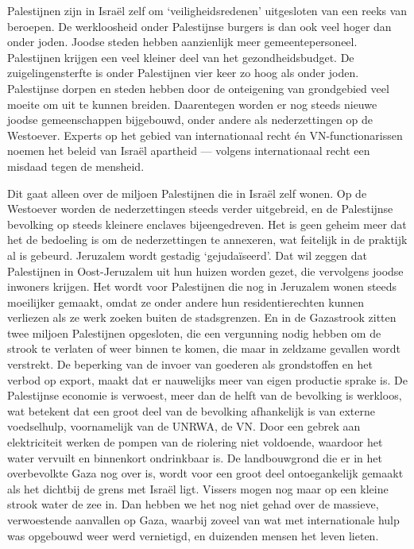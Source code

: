 Palestijnen zijn in Israël zelf om `veiligheidsredenen' uitgesloten van
een reeks van beroepen. De werkloosheid onder Palestijnse burgers is dan
ook veel hoger dan onder joden. Joodse steden hebben aanzienlijk meer
gemeentepersoneel. Palestijnen krijgen een veel kleiner deel van het
gezondheidsbudget. De zuigelingensterfte is onder Palestijnen vier keer
zo hoog als onder joden. Palestijnse dorpen en steden hebben door de
onteigening van grondgebied veel moeite om uit te kunnen breiden.
Daarentegen worden er nog steeds nieuwe joodse gemeenschappen
bijgebouwd, onder andere als nederzettingen op de Westoever. Experts op
het gebied van internationaal recht én VN-functionarissen noemen het
beleid van Israël apartheid --- volgens internationaal recht een misdaad
tegen de mensheid.

Dit gaat alleen over de miljoen Palestijnen die in Israël zelf wonen. Op
de Westoever worden de nederzettingen steeds verder uitgebreid, en de
Palestijnse bevolking op steeds kleinere enclaves bijeengedreven. Het is
geen geheim meer dat het de bedoeling is om de nederzettingen te
annexeren, wat feitelijk in de praktijk al is gebeurd. Jeruzalem wordt
gestadig `gejudaïseerd'. Dat wil zeggen dat Palestijnen in
Oost-Jeruzalem uit hun huizen worden gezet, die vervolgens joodse
inwoners krijgen. Het wordt voor Palestijnen die nog in Jeruzalem wonen
steeds moeilijker gemaakt, omdat ze onder andere hun residentierechten
kunnen verliezen als ze werk zoeken buiten de stadsgrenzen. En in de
Gazastrook zitten twee miljoen Palestijnen opgesloten, die een
vergunning nodig hebben om de strook te verlaten of weer binnen te
komen, die maar in zeldzame gevallen wordt verstrekt. De beperking van
de invoer van goederen als grondstoffen en het verbod op export, maakt
dat er nauwelijks meer van eigen productie sprake is. De Palestijnse
economie is verwoest, meer dan de helft van de bevolking is werkloos,
wat betekent dat een groot deel van de bevolking afhankelijk is van
externe voedselhulp, voornamelijk van de UNRWA, de VN. Door een gebrek
aan elektriciteit werken de pompen van de riolering niet voldoende,
waardoor het water vervuilt en binnenkort ondrinkbaar is. De
landbouwgrond die er in het overbevolkte Gaza nog over is, wordt voor
een groot deel ontoegankelijk gemaakt als het dichtbij de grens met
Israël ligt. Vissers mogen nog maar op een kleine strook water de zee
in. Dan hebben we het nog niet gehad over de massieve, verwoestende
aanvallen op Gaza, waarbij zoveel van wat met internationale hulp was
opgebouwd weer werd vernietigd, en duizenden mensen het leven lieten.

